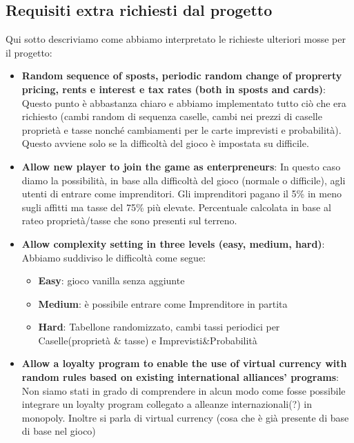 \documentclass{article}
\begin{document}
\subsection{Requisiti extra richiesti dal progetto}
Qui sotto descriviamo come abbiamo interpretato le richieste ulteriori mosse per il progetto:
\begin{itemize}
	\item \textbf{Random sequence of sposts, periodic random change of proprerty pricing, rents e interest e tax rates (both in sposts and cards)}: 
		Questo punto è abbastanza chiaro e abbiamo implementato tutto ciò che era richiesto (cambi random di sequenza caselle, cambi nei prezzi di caselle proprietà e tasse nonché cambiamenti per le carte imprevisti e probabilità).
	Questo avviene solo se la difficoltà del gioco è impostata su difficile.
	
	\item \textbf{Allow new player to join the game as enterpreneurs}: 
		In questo caso diamo la possibilità, in base alla difficoltà del gioco (normale o difficile), agli utenti di entrare come imprenditori. Gli imprenditori pagano il 5\% in meno sugli affitti ma tasse del 75\% più elevate.
	Percentuale calcolata in base al rateo proprietà/tasse che sono presenti sul terreno.
	
	\item \textbf{Allow complexity setting in three levels (easy, medium, hard)}: 
		Abbiamo suddiviso le difficoltà come segue:
		\begin{itemize}
			\item \textbf{Easy}: gioco vanilla senza aggiunte
			\item \textbf{Medium}: è possibile entrare come Imprenditore in partita
			\item \textbf{Hard}: Tabellone randomizzato, cambi tassi periodici per Caselle(proprietà \& tasse) e Imprevisti\&Probabilità	
		\end{itemize}
		
	\item \textbf{Allow a loyalty program to enable the use of virtual currency with random rules based on existing international alliances' programs}: 
		Non siamo stati in grado di comprendere in alcun modo come fosse possibile integrare un loyalty program collegato a alleanze internazionali(?) in monopoly.
	Inoltre si parla di virtual currency (cosa che è già presente di base di base nel gioco)
		
\end{itemize}	
\end{document}
